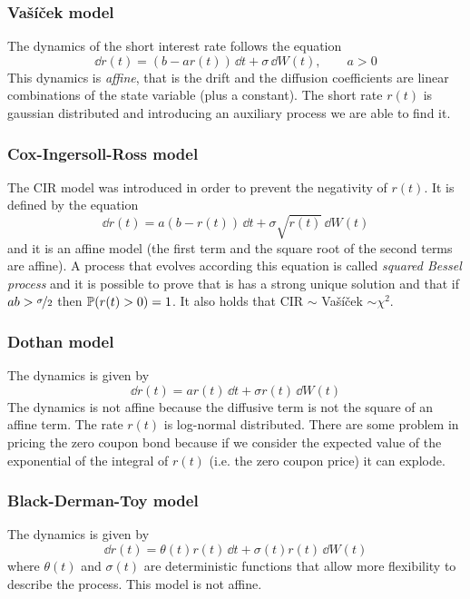 \subsubsection{Vašíček model}
The dynamics of the short interest rate follows the equation
\begin{equation}
    \dd r(t) = (b-ar(t))\,\dd t + \sigma\,\dd W(t), \qquad a>0
\end{equation}
This dynamics is \emph{affine}, that is the drift and the diffusion coefficients are linear combinations of the state variable (plus a constant). The short rate $r(t)$ is gaussian distributed and introducing an auxiliary process we are able to find it.

\subsubsection{Cox-Ingersoll-Ross model}
The CIR model was introduced in order to prevent the negativity of $r(t)$. It is defined by the equation
\begin{equation}
    \dd r(t) = a(b-r(t))\,\dd t + \sigma\sqrt{r(t)}\,\dd W(t)
\end{equation}
and it is an affine model (the first term and the square root of the second terms are affine). A process that evolves according this equation is called \emph{squared Bessel process} and it is possible to prove that is has a strong unique solution and that if $ab>\nicefrac{\sigma}{2}$ then $\mathbb{P}(r(t)>0)=1$. It also holds that CIR $\sim$ Vašíček $\sim \chi^2$.

\subsubsection{Dothan model}
The dynamics is given by
\begin{equation}
    \dd r(t) = ar(t)\,\dd t + \sigma r(t)\,\dd W(t)
\end{equation}
The dynamics is not affine because the diffusive term is not the square of an affine term. The rate $r(t)$ is log-normal distributed. There are some problem in pricing the zero coupon bond because if we consider the expected value of the exponential of the integral of $r(t)$ (i.e. the zero coupon price) it can explode.

\subsubsection{Black-Derman-Toy model}
The dynamics is given by
\begin{equation}
    \dd r(t) = \theta(t)r(t)\,\dd t + \sigma(t)r(t)\,\dd W(t)
\end{equation}
where $\theta(t)$ and $\sigma(t)$ are deterministic functions that allow more flexibility to describe the process. This model is not affine.

